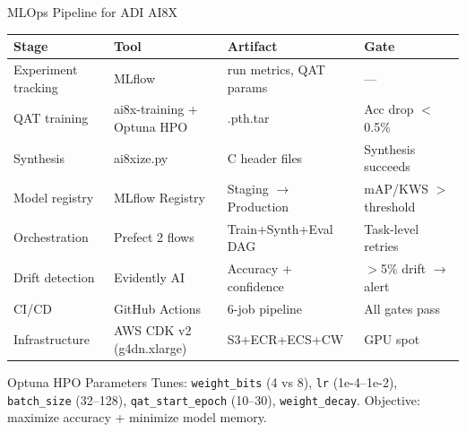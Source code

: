 \documentclass[aspectratio=169]{beamer}
\begin{document}
\begin{frame}{MLOps Pipeline for ADI AI8X}
\small
\begin{tabular}{llll}
\toprule
\textbf{Stage} & \textbf{Tool} & \textbf{Artifact} & \textbf{Gate}\\
\midrule
Experiment tracking & MLflow & run metrics, QAT params & ---\\
QAT training & ai8x-training + Optuna HPO & .pth.tar & Acc drop $<$0.5\%\\
Synthesis & ai8xize.py & C header files & Synthesis succeeds\\
Model registry & MLflow Registry & Staging $\rightarrow$ Production & mAP/KWS $>$ threshold\\
Orchestration & Prefect 2 flows & Train+Synth+Eval DAG & Task-level retries\\
Drift detection & Evidently AI & Accuracy + confidence & $>$5\% drift $\rightarrow$ alert\\
CI/CD & GitHub Actions & 6-job pipeline & All gates pass\\
Infrastructure & AWS CDK v2 (g4dn.xlarge) & S3+ECR+ECS+CW & GPU spot\\
\bottomrule
\end{tabular}
\vspace{0.3cm}
\begin{block}{Optuna HPO Parameters}
\footnotesize Tunes: \texttt{weight\_bits} (4 vs 8), \texttt{lr} (1e-4--1e-2), \texttt{batch\_size} (32--128), \texttt{qat\_start\_epoch} (10--30), \texttt{weight\_decay}. Objective: maximize accuracy + minimize model memory.
\end{block}
\end{frame}
\end{document}
